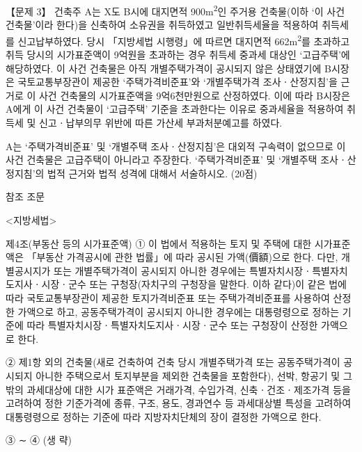 \begin{longquestion}{【문제 3】}
건축주 A는 X도 B시에 대지면적 900m\textsuperscript{2}인 주거용 건축물(이하 ‘이 사건 건축물’이라 한다)을 신축하여 소유권을 취득하였고 일반취득세율을 적용하여 취득세를 신고납부하였다. 당시 「지방세법 시행령」에 따르면 대지면적 662m\textsuperscript{2}를 초과하고 취득 당시의 시가표준액이 9억원을 초과하는 경우 취득세 중과세 대상인 ‘고급주택’에 해당하였다. 이 사건 건축물은 아직 개별주택가격이 공시되지 않은 상태였기에 B시장은 국토교통부장관이 제공한 ‘주택가격비준표’와 ‘개별주택가격 조사ㆍ산정지침’을 근거로 이 사건 건축물의 시가표준액을 9억6천만원으로 산정하였다. 이에 따라 B시장은 A에게 이 사건 건축물이 ‘고급주택’ 기준을 초과한다는 이유로 중과세율을 적용하여 취득세 및 신고ㆍ납부의무 위반에 따른 가산세 부과처분예고를 하였다. \par
A는 ‘주택가격비준표’ 및 ‘개별주택 조사ㆍ산정지침’은 대외적 구속력이 없으므로 이 사건 건축물은 고급주택이 아니라고 주장한다. ‘주택가격비준표’ 및 ‘개별주택 조사ㆍ산정지침’의 법적 근거와 법적 성격에 대해서 서술하시오. (20점) \par
\begin{framedtext}
참조 조문 \par
<지방세법> \par
제4조(부동산 등의 시가표준액) ① 이 법에서 적용하는 토지 및 주택에 대한 시가표준액은 「부동산 가격공시에 관한 법률」에 따라 공시된 가액(價額)으로 한다. 다만, 개별공시지가 또는 개별주택가격이 공시되지 아니한 경우에는 특별자치시장ㆍ특별자치도지사ㆍ시장ㆍ군수 또는 구청장(자치구의 구청장을 말한다. 이하 같다)이 같은 법에 따라 국토교통부장관이 제공한 토지가격비준표 또는 주택가격비준표를 사용하여 산정한 가액으로 하고, 공동주택가격이 공시되지 아니한 경우에는 대통령령으로 정하는 기준에 따라 특별자치시장ㆍ특별자치도지사ㆍ시장ㆍ군수 또는 구청장이 산정한 가액으로 한다. \par
② 제1항 외의 건축물(새로 건축하여 건축 당시 개별주택가격 또는 공동주택가격이 공시되지 아니한 주택으로서 토지부분을 제외한 건축물을 포함한다), 선박, 항공기 및 그 밖의 과세대상에 대한 시가 표준액은 거래가격, 수입가격, 신축ㆍ건조ㆍ제조가격 등을 고려하여 정한 기준가격에 종류, 구조, 용도, 경과연수 등 과세대상별 특성을 고려하여 대통령령으로 정하는 기준에 따라 지방자치단체의 장이 결정한 가액으로 한다. \par
③ ∼ ④ (생 략) \par
\end{framedtext}
\end{longquestion}
